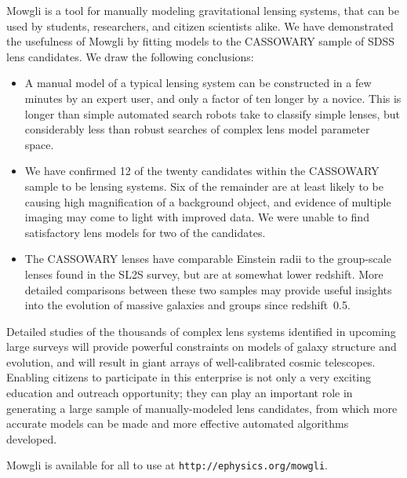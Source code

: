 \documentclass[iop]{emulateapj}
\def\theapplet{{\sc Mowgli}\xspace}
\begin{document}
\theapplet is a tool for manually modeling gravitational lensing systems, that
can be used by students, researchers, and citizen scientists alike. We have
demonstrated the usefulness of  \theapplet by fitting models to the CASSOWARY
sample of SDSS lens candidates. We draw the following conclusions:
\begin{itemize}
  \item A manual model of a typical lensing system can be constructed in a few
        minutes by an expert user, and only a factor of ten longer by a novice.
        This is longer than simple automated search robots take to classify
        simple lenses, but considerably less than robust searches of complex
        lens model parameter space.
  \item We have confirmed 12 of the twenty candidates within the CASSOWARY
        sample to be lensing systems. Six of the remainder are at least
        likely to be causing  high magnification of a background object,  and
        evidence of multiple imaging may come to light with improved data. We
        were unable to find satisfactory lens models for two of the
        candidates.  
  \item The CASSOWARY lenses have comparable Einstein radii to the group-scale
        lenses found in the SL2S survey, but are at somewhat lower redshift.
        More detailed comparisons between these two samples may provide useful
        insights into the evolution of massive galaxies and groups since
        redshift~0.5.
\end{itemize}
Detailed studies of the thousands of complex lens systems identified  in
upcoming large surveys will provide powerful constraints on models of galaxy
structure and evolution, and  will result in giant arrays of well-calibrated
cosmic telescopes. Enabling citizens to participate in this enterprise is not
only a very exciting education and outreach opportunity; they can play an
important role in generating  a large sample of manually-modeled lens
candidates, from which more accurate models can be made and more  effective
automated algorithms developed. 

\theapplet is available for all to use at \texttt{http://ephysics.org/mowgli}.



\acknowledgments
\end{document}
